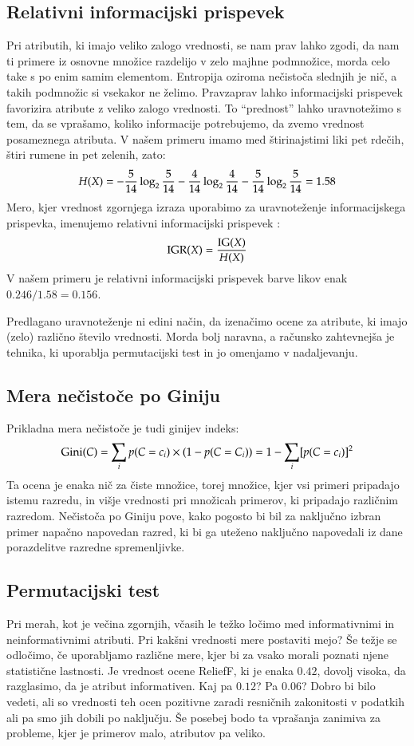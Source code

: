 \subsection{Relativni informacijski prispevek}

Pri atributih, ki imajo veliko zalogo vrednosti, se nam prav lahko zgodi, da nam ti primere iz osnovne množice razdelijo v zelo majhne podmnožice, morda celo take s po enim samim elementom. Entropija oziroma nečistoča slednjih je nič, a takih podmnožic si vsekakor ne želimo. Pravzaprav lahko informacijski prispevek favorizira atribute z veliko zalogo vrednosti. To ``prednost'' lahko uravnotežimo s tem, da se vprašamo, koliko informacije potrebujemo, da zvemo vrednost posameznega atributa. V našem primeru imamo med štirinajstimi liki pet rdečih, štiri rumene in pet zelenih, zato:
$$ H(X)=-{5\over 14}\log_2{5\over 14}-{4\over 14}\log_2{4\over 14}-{5\over 14}\log_2{5\over 14}=1.58 $$
%
Mero, kjer vrednost zgornjega izraza uporabimo za uravnoteženje informacijskega prispevka, imenujemo relativni informacijski prispevek :
%
$$ {\rm IGR}(X) = {{\rm IG}(X)\over H(X)} $$
V našem primeru je relativni informacijski prispevek barve likov enak $0.246/1.58=0.156$.

Predlagano uravnoteženje ni edini način, da izenačimo ocene za atribute, ki imajo (zelo) različno število vrednosti. Morda bolj naravna, a računsko zahtevnejša je tehnika, ki uporablja permutacijski test in jo omenjamo v nadaljevanju.

\subsection{Mera nečistoče po Giniju}

Prikladna mera nečistoče je tudi ginijev indeks:
$$ {\rm Gini}(C)=\sum_{i}p(C=c_i)\times (1-p(C=C_i)) = 1 - \sum_i [p(C=c_i)]^2 $$
Ta ocena je enaka nič za čiste množice, torej množice, kjer vsi primeri pripadajo istemu razredu, in višje vrednosti pri množicah primerov, ki pripadajo različnim razredom. Nečistoča po Giniju pove, kako pogosto bi bil za naključno izbran primer napačno napovedan razred, ki bi ga uteženo naključno napovedali iz dane porazdelitve razredne spremenljivke.

\subsection{Permutacijski test}

Pri merah, kot je večina zgornjih, včasih le težko ločimo med informativnimi in neinformativnimi atributi. Pri kakšni vrednosti mere postaviti mejo? Še težje se odločimo, če uporabljamo različne mere, kjer bi za vsako morali poznati njene statistične lastnosti. Je vrednost ocene ReliefF, ki je enaka $0.42$, dovolj visoka, da razglasimo, da je atribut informativen. Kaj pa $0.12$? Pa $0.06$? Dobro bi bilo vedeti, ali so vrednosti teh ocen pozitivne zaradi resničnih zakonitosti v podatkih ali pa smo jih dobili po naključju. Še posebej bodo ta vprašanja zanimiva za probleme, kjer je primerov malo, atributov pa veliko. 

